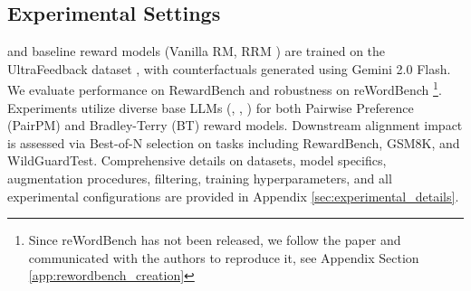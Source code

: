 \subsection{Experimental Settings}
\label{subsec:experimental_settings}


\carma{} and baseline reward models (Vanilla RM, RRM \citep{liu2024rrm}) are trained on the UltraFeedback dataset \citep{cui2023ultrafeedback}, with counterfactuals generated using Gemini 2.0 Flash.
We evaluate performance on RewardBench \citep{lambert2024rewardbench} and robustness on reWordBench \citep{wu2025rewordbench} \footnote{Since reWordBench has not been released, we follow the paper and communicated with the authors to reproduce it, see Appendix Section \ref{app:rewordbench_creation}}. Experiments utilize diverse base LLMs (, \qwen{}, ) for both Pairwise Preference (PairPM) and Bradley-Terry (BT) reward models. Downstream alignment impact is assessed via Best-of-N selection on tasks including RewardBench, GSM8K, and WildGuardTest.
Comprehensive details on datasets, model specifics, augmentation procedures, filtering, training hyperparameters, and all experimental configurations are provided in Appendix \ref{sec:experimental_details}.